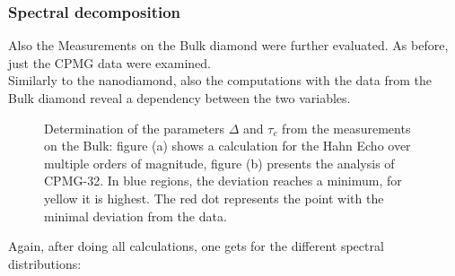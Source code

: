 \documentclass[12pt,a4paper]{article}
\begin{document}
\subsubsection{Spectral decomposition}
Also the Measurements on the Bulk diamond were further evaluated. As before, just the CPMG data were examined.\\
Similarly to the nanodiamond, also the computations with the data from the Bulk diamond reveal a dependency between the two variables.
\begin{figure}[h!]\label{HB} 
    \caption{Determination of the parameters $\Delta$ and $\tau_c$ from the measurements on the Bulk: figure (a) shows a calculation for the Hahn Echo over multiple orders of magnitude, figure (b) presents the analysis of CPMG-32. In blue regions, the deviation reaches a minimum, for yellow it is highest. The red dot represents the point with the minimal deviation from the data.}
\end{figure}
\newpage
Again, after doing all calculations, one gets for the different spectral distributions:
\end{document}
